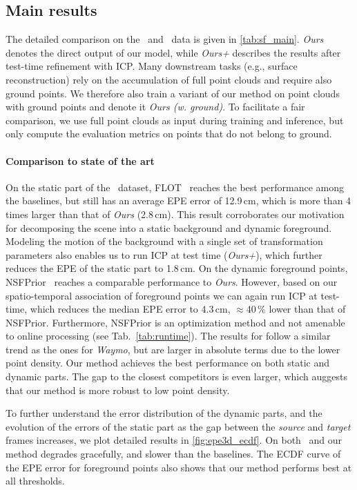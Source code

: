 \subsection{Main results}
\label{sec:evaluation_results}
The detailed comparison on the \waymo~and \nuscenes~data is given in \cref{tab:sf_main}. \emph{Ours} denotes the direct output of our model, while \emph{Ours+} describes the results after test-time refinement with ICP. Many downstream tasks (e.g., surface reconstruction) rely on the accumulation of full point clouds and require also ground points. We therefore also train a variant of our method on point clouds with ground points and denote it \emph{Ours (w. ground)}. To facilitate a fair comparison, we use full point clouds as input during training and inference, but only compute the evaluation metrics on points that do not belong to ground. 

\paragraph{Comparison to state of the art}

On the static part of the \textbf{\waymo}~dataset, FLOT~\cite{puy2020flot} reaches the best performance among the baselines, but still has an average EPE error of 12.9$\,$cm, which is more than 4 times larger than that of \textit{Ours} (2.8$\,$cm). This result corroborates our motivation for decomposing the scene into a static background and dynamic foreground. Modeling the motion of the background with a single set of transformation parameters also enables us to run ICP at test time (\textit{Ours+}), which further reduces the EPE of the static part to 1.8$\,$cm. On the dynamic foreground points, NSFPrior~\cite{li2021neural} reaches a comparable performance to \textit{Ours}. However, based on our spatio-temporal association of foreground points we can again run ICP at test-time, which reduces the median EPE error to 4.3$\,$cm, $\approx$40$\,\%$ lower than that of NSFPrior. Furthermore, NSFPrior is an optimization method and not amenable to online processing (see Tab.~\ref{tab:runtime}). The results for \textbf{\nuscenes} follow a similar trend as the ones for \emph{Waymo}, but are larger in absolute terms due to the lower point density. Our method achieves the best performance on both static and dynamic parts. The gap to the closest competitors is even larger, which auggests that our method is more robust to low point density.

To further understand the error distribution of the dynamic parts, and the evolution of the errors of the static part as the gap between the \textit{source} and \textit{target} frames increases, we plot detailed results in \cref{fig:epe3d_ecdf}. On both \waymo~and \nuscenes{} our method degrades gracefully, and slower than the baselines. The ECDF curve of the EPE error for foreground points also shows that our method performs best at all thresholds. 

